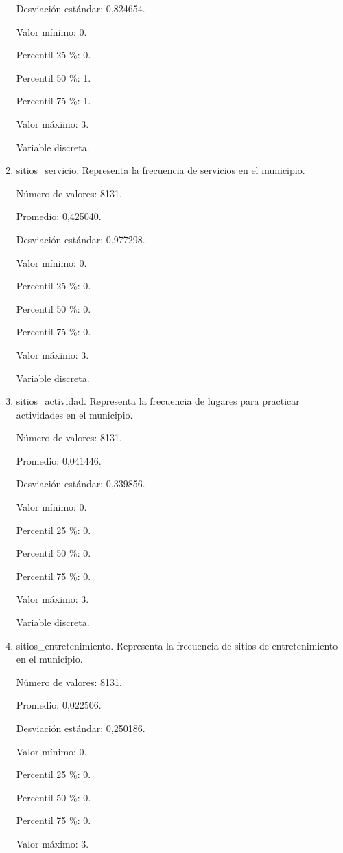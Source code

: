 \begin{enumerate}
	Desviación estándar: 0,824654.
	
	Valor mínimo: 0.
	
	Percentil 25 \%: 0.
	
	Percentil 50 \%: 1.
	
	Percentil 75 \%: 1.
	
	Valor máximo: 3.
	
	Variable discreta.

	\item sitios\_servicio. Representa la frecuencia de servicios en el municipio.
	
	Número de valores: 8131.
	
	Promedio: 0,425040.
	
	Desviación estándar: 0,977298.
	
	Valor mínimo: 0.
	
	Percentil 25 \%: 0.
	
	Percentil 50 \%: 0.
	
	Percentil 75 \%: 0.
	
	Valor máximo: 3.
	
	Variable discreta.

	\item sitios\_actividad. Representa la frecuencia de lugares para practicar actividades en el municipio.
	
	Número de valores: 8131.
	
	Promedio: 0,041446.
	
	Desviación estándar: 0,339856.
	
	Valor mínimo: 0.
	
	Percentil 25 \%: 0.
	
	Percentil 50 \%: 0.
	
	Percentil 75 \%: 0.
	
	Valor máximo: 3.
	
	Variable discreta.

	\item sitios\_entretenimiento. Representa la frecuencia de sitios de entretenimiento en el municipio.
	
	Número de valores: 8131.
	
	Promedio: 0,022506.
	
	Desviación estándar: 0,250186.
	
	Valor mínimo: 0.
	
	Percentil 25 \%: 0.
	
	Percentil 50 \%: 0.
	
	Percentil 75 \%: 0.
	
	Valor máximo: 3.
	

\end{enumerate}
